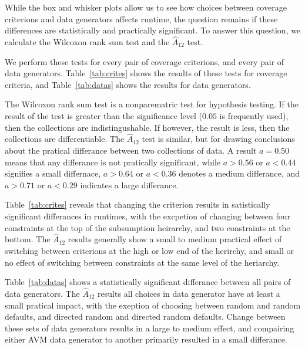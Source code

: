 
While the box and whisker plots allow us to see how choices between coverage criterions and data generators affects
runtime, the question remains if these differences are statistically and practically significant. To answer this
question, we calculate the Wilcoxon rank sum test and the $\hat{A}_{12}$ test.

We perform these tests for every pair of coverage criterions, and every pair of data generators.  Table~\ref{tab:crites}
shows the results of these tests for coverage criteria, and Table~\ref{tab:datas} shows the results for data generators.

The Wilcoxon rank sum test is a nonparematric test for hypothesis
testing.  If the result of the test is greater than the significance
level ($0.05$ is frequently used), then the collections are
indistingushable.  If however, the result is less, then the collections
are differentiable.  The $\hat{A}_{12}$ test is similar, but for drawing
conclusions about the pratical differance between two collections of
data.  A result $a=0.5$0 means that any differance is not pratically
significant, while $a>0.56$ or $a<0.44$ signifies a small differnace,
$a>0.64$ or $a<0.36$ denotes a medium differance, and $a>0.71$ or
$a<0.29$ indicates a large differance. 

Table~\ref{tab:crites} reveals that changing the criterion results in
satistically significant differances in runtimes, with the excpetion of
changing between four constraints at the top of the subsumption
heirarchy, and two constraints at the bottom.  The $\hat{A}_{12}$
results generally show a small to medium practical effect of switching
between criterions at the high or low end of the herirchy, and small or
no effect of switching between constraints at the same level of the
heriarchy.

Table~\ref{tab:datas} shows a statistically significant differance
between all pairs of data generators. The $\hat{A}_{12}$ results all
choices in data generator have at least a small pratical impact, with
the exeption of choosing between random and random defaults, and
directed random and directed random defaults.  Change between these sets
of data generators results in a large to medium effect, and compairing
either AVM data generator to another primarily resulted in a small
differance.

